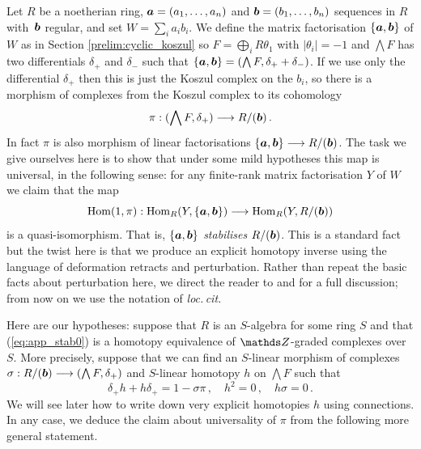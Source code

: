 \documentclass{compositio}
\theoremstyle{definition}
\numberwithin{equation}{section}
\def\Hom{\operatorname{Hom}}
\begin{document}
Let $R$ be a noetherian ring, $\boldsymbol{a} = (a_1,\ldots,a_n)$ and $\boldsymbol{b} = (b_1, \ldots, b_n)$ sequences in $R$ with~$\boldsymbol{b}$ regular, and set $W = \sum_i a_i b_i$. We define the matrix factorisation $\{ \boldsymbol{a}, \boldsymbol{b} \}$ of $W$ as in Section \ref{prelim:cyclic_koszul} so $F = \bigoplus_i R \theta_1$ with $|\theta_i| = -1$ and $\bigwedge F$ has two differentials $\delta_+$ and $\delta_{-}$ such that $\{ \boldsymbol{a}, \boldsymbol{b} \} = (\bigwedge F, \delta_+ + \delta_{-})$. If we use only the differential $\delta_+$ then this is just the Koszul complex on the $b_i$, so there is a morphism of complexes from the Koszul complex to its cohomology
\begin{equation}\label{eq:app_stab0}
\pi: ( \bigwedge F, \delta_+ ) \longrightarrow R/(\boldsymbol{b})\,.
\end{equation}
In fact $\pi$ is also morphism of linear factorisations $\{ \boldsymbol{a}, \boldsymbol{b} \} \longrightarrow R/(\boldsymbol{b})$. The task we give ourselves here is to show that under some mild hypotheses this map is universal, in the following sense: for any finite-rank matrix factorisation $Y$ of $W$ we claim that the map
\begin{equation}\label{eq:app_stab1}
\Hom(1, \pi): \Hom_R(Y, \{ \ba, \bb \}) \lto \Hom_R(Y, R/(\bb))
\end{equation}
is a quasi-isomorphism. That is, $\{ \boldsymbol{a}, \boldsymbol{b} \}$ \emph{stabilises} $R/(\boldsymbol{b})$. This is a standard fact \cite{tobythesis,eisenbud,rasmussen,webster} but the twist here is that we produce an explicit homotopy inverse using the language of deformation retracts and perturbation. Rather than repeat the basic facts about perturbation here, we direct the reader to \cite[Section 5]{dm1102.2957} and \cite{crainic} for a full discussion; from now on we use the notation of \emph{loc.\,cit.}

Here are our hypotheses: suppose that $R$ is an $S$-algebra for some ring $S$ and that (\ref{eq:app_stab0}) is a homotopy equivalence of $\ZZ$-graded complexes over $S$. More precisely, suppose that we can find an $S$-linear morphism of complexes $\sigma: R/(\boldsymbol{b}) \longrightarrow (\bigwedge F, \delta_+)$ and $S$-linear homotopy $h$ on $\bigwedge F$ such that
\begin{equation}\label{eq:homotopycond}
\delta_+ h + h \delta_+ = 1 - \sigma \pi\,, \quad h^2 = 0\,, \quad h \sigma = 0\,.
\end{equation}
We will see later how to write down very explicit homotopies $h$ using connections. In any case, we deduce the claim about universality of $\pi$ from the following more general statement.
\end{document}
